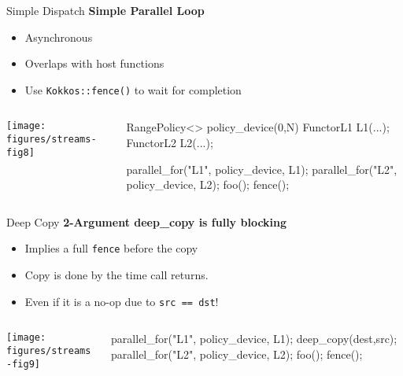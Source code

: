 
\begin{frame}[fragile]{Simple Dispatch}
  \textbf{Simple Parallel Loop}
  \begin{itemize}
    \item{Asynchronous}
    \item{Overlaps with host functions}
    \item{Use \texttt{Kokkos::fence()} to wait for completion}
  \end{itemize}

  \begin{columns}[]
    \begin{column}{.67\textwidth}

       \texttt{[image: figures/streams-fig8]} 
 
    \end{column}

    \begin{column}{.33\textwidth}
	    \begin{code}[linebackgroundcolor={},keywords={L1,L2,policy_device}]
RangePolicy<> 
  policy_device(0,N)
FunctorL1 L1(...);
FunctorL2 L2(...);

parallel_for("L1", 
  policy_device, L1);
parallel_for("L2", 
  policy_device, L2);
foo();
fence();
      \end{code}
    \end{column}
  \end{columns}
\end{frame}


\begin{frame}[fragile]{Deep Copy}
  \textbf{2-Argument deep\_copy is fully blocking}
  \begin{itemize}
    \item{Implies a full \texttt{fence} before the copy}
    \item{Copy is done by the time call returns.}
    \item{Even if it is a no-op due to \texttt{src == dst}!}
  \end{itemize}

  \begin{columns}[]
    \begin{column}{.67\textwidth}

       \texttt{[image: figures/streams-fig9]} 
 
    \end{column}

    \begin{column}{.33\textwidth}
	    \begin{code}[linebackgroundcolor={},keywords={L1,L2,policy_device}]

parallel_for("L1", 
  policy_device, L1);
deep_copy(dest,src);
parallel_for("L2", 
  policy_device, L2);
foo();
fence();
      \end{code}
    \end{column}
  \end{columns}
\end{frame}

